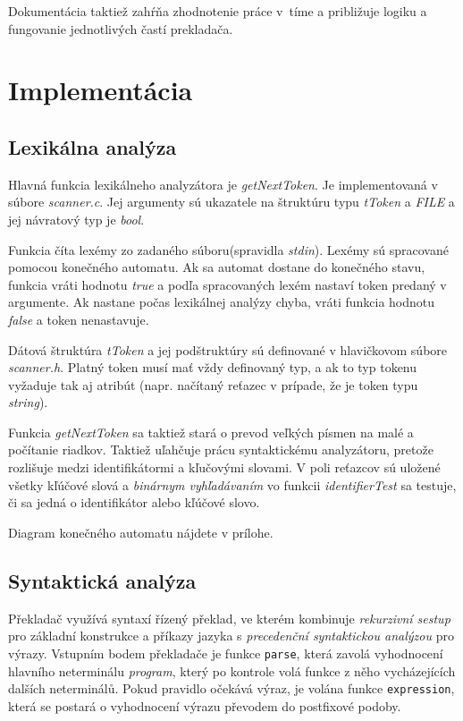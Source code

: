 \documentclass{article}
\begin{document}
        Dokumentácia taktiež zahŕňa zhodnotenie práce v~tíme a približuje logiku a fungovanie
        jednotlivých častí prekladača. 
    
    \section{Implementácia}
    
        \subsection{Lexikálna analýza}
            Hlavná funkcia lexikálneho analyzátora je \emph{getNextToken}. Je implementovaná v súbore \emph{scanner.c}.
            Jej argumenty sú ukazatele na štruktúru typu \emph{tToken} a \emph{FILE} a jej návratový typ je \emph{bool}. 

            Funkcia číta lexémy zo zadaného súboru(spravidla \emph{stdin}). Lexémy sú spracované pomocou konečného automatu. 
            Ak sa automat dostane do konečného stavu, funkcia vráti hodnotu \emph{true} a podľa spracovaných lexém nastaví
            token predaný v argumente. Ak nastane počas lexikálnej analýzy chyba, vráti funkcia hodnotu \emph{false} a 
            token nenastavuje. 

            Dátová štruktúra \emph{tToken} a jej podštruktúry sú definované v hlavičkovom súbore \emph{scanner.h}. 
            Platný token musí mať vždy definovaný typ, a ak to typ tokenu vyžaduje tak aj atribút 
            (napr. načítaný reťazec v prípade, že je token typu \emph{string}). 

            Funkcia \emph{getNextToken} sa taktiež stará o prevod veľkých písmen na malé a počítanie riadkov.
            Taktiež uľahčuje prácu syntaktickému analyzátoru, pretože rozlišuje medzi identifikátormi a kľučovými slovami.
            V poli reťazcov sú uložené všetky kľúčové slová a \emph{binárnym vyhľadávaním} vo funkcii \emph{identifierTest} 
            sa testuje, či sa jedná o identifikátor alebo kľúčové slovo.

            Diagram konečného automatu nájdete v prílohe.

        \subsection{Syntaktická analýza}
            Překladač využívá syntaxí řízený překlad, ve kterém kombinuje \emph{rekurzivní sestup} pro základní konstrukce
            a příkazy jazyka s \emph{precedenční syntaktickou analýzou} pro výrazy.
            Vstupním bodem překladače je funkce \texttt{parse}, která zavolá vyhodnocení hlavního neterminálu \emph{program},
            který po kontrole volá funkce z něho vycházejících dalších neterminálů.
            Pokud pravidlo očekává výraz, je volána funkce \texttt{expression}, která se postará o vyhodnocení výrazu převodem
            do postfixové podoby.
            
\end{document}
